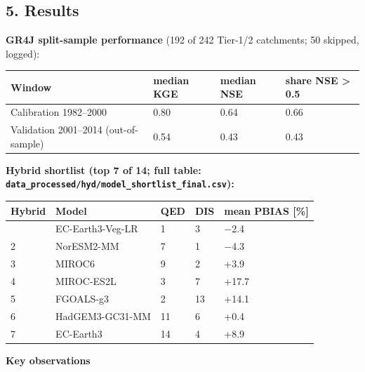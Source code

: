 \documentclass[
  english,
  11pt,
]{article}
\newcounter{none} %
\begin{document}
\subsection{5. Results}\label{results}

\textbf{GR4J split-sample performance} (192 of 242 Tier-1/2 catchments;
50 skipped, logged):

{\def\LTcaptype{none} %
\begin{longtable}[]{@{}llll@{}}
\toprule\noalign{}
Window & median KGE & median NSE & share NSE \textgreater{} 0.5 \\
\midrule\noalign{}
\endhead
\bottomrule\noalign{}
\endlastfoot
Calibration 1982--2000 & 0.80 & 0.64 & 0.66 \\
Validation 2001--2014 (out-of-sample) & 0.54 & 0.43 & 0.43 \\
\end{longtable}
}

\textbf{Hybrid shortlist (top 7 of 14; full table:
\texttt{data\_processed/hyd/model\_shortlist\_final.csv}):}

{\def\LTcaptype{none} %
\begin{longtable}[]{@{}lllll@{}}
\toprule\noalign{}
Hybrid & Model & QED & DIS & mean PBIAS {[}\%{]} \\
\midrule\noalign{}
\endhead
\bottomrule\noalign{}
\endlastfoot
1 & EC-Earth3-Veg-LR & 1 & 3 & −2.4 \\
2 & NorESM2-MM & 7 & 1 & −4.3 \\
3 & MIROC6 & 9 & 2 & +3.9 \\
4 & MIROC-ES2L & 3 & 7 & +17.7 \\
5 & FGOALS-g3 & 2 & 13 & +14.1 \\
6 & HadGEM3-GC31-MM & 11 & 6 & +0.4 \\
7 & EC-Earth3 & 14 & 4 & +8.9 \\
\end{longtable}
}

\textbf{Key observations}
\end{document}
